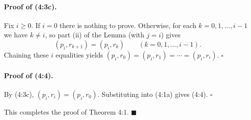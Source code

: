 \documentclass[11pt]{article}
\begin{document}
\paragraph{Proof of (4:3c).}
Fix $i \ge 0$. If $i = 0$ there is nothing to prove. Otherwise, for each
$k = 0, 1, \dots, i-1$ we have $k \neq i$, so part (ii) of the Lemma (with $j = i$) gives
\[
(p_i, r_{k+1}) = (p_i, r_k) \qquad (k = 0, 1, \dots, i-1).
\]
Chaining these $i$ equalities yields
$(p_i, r_0) = (p_i, r_1) = \cdots = (p_i, r_i)$. \hfill$\square$

\paragraph{Proof of (4:4).}
By (4:3c), $(p_i, r_i) = (p_i, r_0)$. Substituting into (4:1a) gives (4:4). \hfill$\square$

\medskip
This completes the proof of Theorem 4:1. \hfill$\blacksquare$
\end{document}
